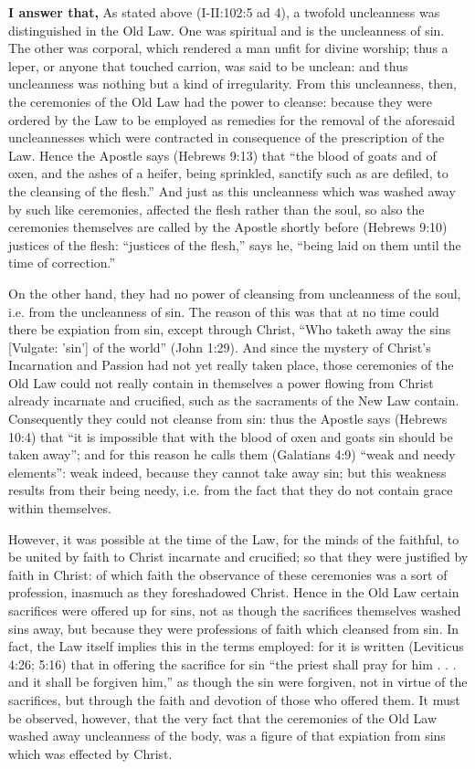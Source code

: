 \textbf{I answer that,} As stated above (I-II:102:5 ad 4), a twofold uncleanness was distinguished in the Old Law. One was spiritual and is the uncleanness of sin. The other was corporal, which rendered a man unfit for divine worship; thus a leper, or anyone that touched carrion, was said to be unclean: and thus uncleanness was nothing but a kind of irregularity. From this uncleanness, then, the ceremonies of the Old Law had the power to cleanse: because they were ordered by the Law to be employed as remedies for the removal of the aforesaid uncleannesses which were contracted in consequence of the prescription of the Law. Hence the Apostle says (Hebrews 9:13) that ``the blood of goats and of oxen, and the ashes of a heifer, being sprinkled, sanctify such as are defiled, to the cleansing of the flesh.'' And just as this uncleanness which was washed away by such like ceremonies, affected the flesh rather than the soul, so also the ceremonies themselves are called by the Apostle shortly before (Hebrews 9:10) justices of the flesh: ``justices of the flesh,'' says he, ``being laid on them until the time of correction.''

On the other hand, they had no power of cleansing from uncleanness of the soul, i.e. from the uncleanness of sin. The reason of this was that at no time could there be expiation from sin, except through Christ, ``Who taketh away the sins [Vulgate: 'sin'] of the world'' (John 1:29). And since the mystery of Christ's Incarnation and Passion had not yet really taken place, those ceremonies of the Old Law could not really contain in themselves a power flowing from Christ already incarnate and crucified, such as the sacraments of the New Law contain. Consequently they could not cleanse from sin: thus the Apostle says (Hebrews 10:4) that ``it is impossible that with the blood of oxen and goats sin should be taken away''; and for this reason he calls them (Galatians 4:9) ``weak and needy elements'': weak indeed, because they cannot take away sin; but this weakness results from their being needy, i.e. from the fact that they do not contain grace within themselves.

However, it was possible at the time of the Law, for the minds of the faithful, to be united by faith to Christ incarnate and crucified; so that they were justified by faith in Christ: of which faith the observance of these ceremonies was a sort of profession, inasmuch as they foreshadowed Christ. Hence in the Old Law certain sacrifices were offered up for sins, not as though the sacrifices themselves washed sins away, but because they were professions of faith which cleansed from sin. In fact, the Law itself implies this in the terms employed: for it is written (Leviticus 4:26; 5:16) that in offering the sacrifice for sin ``the priest shall pray for him . . . and it shall be forgiven him,'' as though the sin were forgiven, not in virtue of the sacrifices, but through the faith and devotion of those who offered them. It must be observed, however, that the very fact that the ceremonies of the Old Law washed away uncleanness of the body, was a figure of that expiation from sins which was effected by Christ.

